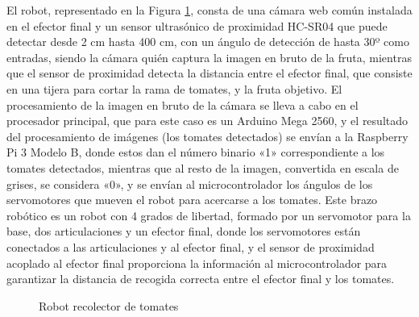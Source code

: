 El robot, representado en la Figura \ref{fig:Robots_tomates}, consta de una cámara web común instalada en el efector final y un sensor ultrasónico de proximidad HC-SR04 que puede detectar desde 2 cm hasta 400 cm, con un ángulo de detección de hasta 30º como entradas, siendo la cámara quién captura la imagen en bruto de la fruta, mientras que el sensor de proximidad detecta la distancia entre el efector final, que consiste en una tijera para cortar la rama de tomates, y la fruta objetivo. El procesamiento de la imagen en bruto de la cámara se lleva a cabo en el procesador principal, que para este caso es un Arduino Mega 2560, y el resultado del procesamiento de imágenes (los tomates detectados) se envían a la Raspberry Pi 3 Modelo B, donde estos dan el número binario «1» correspondiente a los tomates detectados, mientras que al resto de la imagen, convertida en escala de grises, se considera «0», y se envían al microcontrolador los ángulos de los servomotores que mueven el robot para acercarse a los tomates. Este brazo robótico es un robot con 4 grados de libertad, formado por un servomotor para la base, dos articulaciones y un efector final, donde los servomotores están conectados a las articulaciones y al efector final, y el sensor de proximidad acoplado al efector final proporciona la información al microcontrolador para garantizar la distancia de recogida correcta entre el efector final y los tomates.\\

\begin{figure}[H]
    \begin{center}
      \subcapcentertrue
      \hspace{2mm}
    \end{center}
    \caption{Robot recolector de tomates}
    \label{fig:Robots_tomates}
\end{figure}

